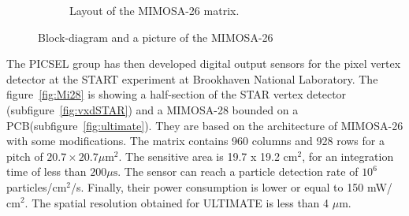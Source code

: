 \begin{figure}[!h]
\begin{subfigure}[t]{0.4\textwidth}
        \caption{Layout of the MIMOSA-26 matrix.}
        \label{fig:archMi26}
    \end{subfigure}
    \caption{Block-diagram and a picture of the MIMOSA-26}\label{fig:Mi26}
    \end{figure}    



    The PICSEL group has then developed digital output sensors for the pixel vertex detector at the START experiment at Brookhaven National Laboratory\cite{}.
    The figure~\ref{fig:Mi28} is showing a half-section of the STAR vertex detector (subfigure~\ref{fig:vxdSTAR}) and a \gls{MIMOSA}-28 bounded on a PCB(subfigure~\ref{fig:ultimate}).
    They are based on the architecture of \gls{MIMOSA}-26 with some modifications.
    The matrix contains 960 columns and 928 rows for a pitch of $20.7 \times 20.7 \mu\text{m}^2$.
    The sensitive area is 19.7 x 19.2 $\text{cm}^2$, for an integration time of less than $200\mu\text{s}$.
    The sensor can reach a particle detection rate of $10^6$ particles/$\text{cm}^2$/s. 
    Finally, their power consumption is lower or equal to 150 mW/$\text{cm}^2$.
    The spatial resolution obtained for ULTIMATE is less than 4 $\mu\text{m}$.

  


